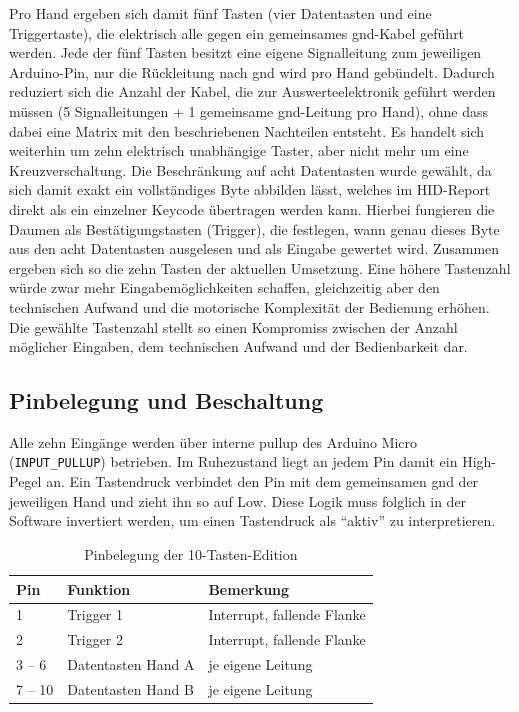 \documentclass{article}
\begin{document}
Pro Hand ergeben sich damit fünf Tasten (vier Datentasten und eine Triggertaste), die elektrisch alle gegen ein gemeinsames \gls{gnd}-Kabel geführt werden. Jede der fünf Tasten besitzt eine eigene Signalleitung zum jeweiligen Arduino-Pin, nur die Rückleitung nach \gls{gnd} wird pro Hand gebündelt. Dadurch reduziert sich die Anzahl der Kabel, die zur Auswerteelektronik geführt werden müssen (5 Signalleitungen + 1 gemeinsame \gls{gnd}-Leitung pro Hand), ohne dass dabei eine Matrix mit den beschriebenen Nachteilen entsteht. Es handelt sich weiterhin um zehn elektrisch unabhängige Taster, aber nicht mehr um eine Kreuzverschaltung.
Die Beschränkung auf acht Datentasten wurde gewählt, da sich damit exakt ein vollständiges Byte abbilden lässt, welches im HID-Report direkt als ein einzelner Keycode übertragen werden kann. Hierbei fungieren die Daumen als Bestätigungstasten (Trigger), die festlegen, wann genau dieses Byte aus den acht Datentasten ausgelesen und als Eingabe gewertet wird. Zusammen ergeben sich so die zehn Tasten der aktuellen Umsetzung. Eine höhere Tastenzahl würde zwar mehr Eingabemöglichkeiten schaffen, gleichzeitig aber den technischen Aufwand und die motorische Komplexität der Bedienung erhöhen. Die gewählte Tastenzahl stellt so einen Kompromiss zwischen der Anzahl möglicher Eingaben, dem technischen Aufwand und der Bedienbarkeit dar.




\subsection{Pinbelegung und Beschaltung}
Alle zehn Eingänge werden über interne \gls{pullup} des Arduino Micro (\texttt{INPUT\_PULLUP}) betrieben. Im Ruhezustand liegt an jedem Pin damit ein High-Pegel an. Ein Tastendruck verbindet den Pin mit dem gemeinsamen \gls{gnd} der jeweiligen Hand und zieht ihn so auf Low. Diese Logik muss folglich in der Software invertiert werden, um einen Tastendruck als \enquote{aktiv} zu interpretieren.

\begin{table}[ht]
\centering
\begin{tabular}{lll}
\toprule
\textbf{Pin} & \textbf{Funktion} & \textbf{Bemerkung} \\
\midrule
1 & Trigger 1 & Interrupt, fallende Flanke \\
2 & Trigger 2 & Interrupt, fallende Flanke \\
3 -- 6 & Datentasten Hand A & je eigene Leitung \\
7 -- 10 & Datentasten Hand B & je eigene Leitung \\
\bottomrule
\end{tabular}
\caption{Pinbelegung der 10-Tasten-Edition}
\end{table}
\end{document}
